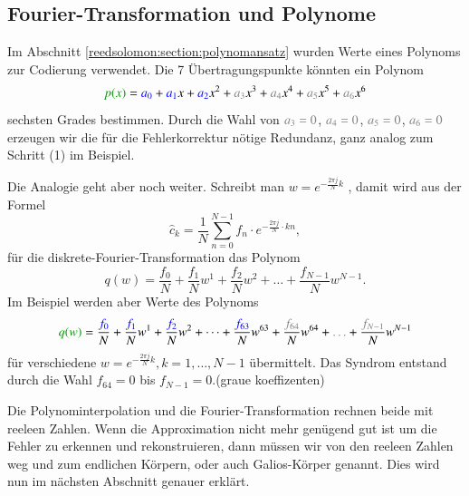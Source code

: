 \subsection{Fourier-Transformation und Polynome\label{reedsolomon:subsection:ftandpolynom}}
Im Abschnitt \ref{reedsolomon:section:polynomansatz}
wurden Werte eines Polynoms zur Codierung verwendet.
Die 7 Übertragungspunkte könnten ein Polynom
\begin{equation}
	\textcolor{darkgreen}{p(x)}
	=
	\textcolor{blue}{a_0} + \textcolor{blue}{a_1}x + \textcolor{blue}{a_2}x^2 +
	\textcolor{gray}{a_3}x^3 + \textcolor{gray}{a_4}x^4 + \textcolor{gray}{a_5}x^5 +
	\textcolor{gray}{a_6}x^6
\label{reedsolomon:equationpoly}
\end{equation}
sechsten Grades bestimmen.
Durch die Wahl von $\textcolor{gray}{a_3=0}$, $\textcolor{gray}{a_4=0}$, $\textcolor{gray}{a_5=0}$, $\textcolor{gray}{a_6=0}$ 
erzeugen wir die für die Fehlerkorrektur nötige Redundanz, ganz analog zum Schritt (1) im Beispiel.
\par 
Die Analogie geht aber noch weiter.
 Schreibt man 
 \( w =
 e^{-\frac{2\pi j}{N} k}\)
 \label{reedsolomon:DFT_summand}, damit wird aus der Formel
 \begin{equation}
	\hat{c}_{k} 
	= \frac{1}{N} \sum_{n=0}^{N-1}
	{f}_n \cdot e^{-\frac{2\pi j}{N} \cdot kn}
	,\label{reedsolomon:DFT}
 \end{equation}
 für die diskrete-Fourier-Transformation das Polynom
 \begin{equation}
	q(w)=
	\frac{{f}_0}{N} + \frac{{f}_1}{N} w^1 + \frac{{f}_2}{N} w^2 + \dots + \frac{{f}_{N-1}}{N} w^{N-1}.
	\label{reedsolomon:DFT_polynom}
 \end{equation}
 Im Beispiel werden aber Werte des Polynoms
 \begin{equation}
	\textcolor{darkgreen}{q(w)}=
	\frac{\textcolor{blue}{{f}_0}}{N} + \frac{\textcolor{blue}{{f}_1}}{N} w^1 + \frac{\textcolor{blue}{{f}_2}}{N} w^2 + \dots + 
	\frac{\textcolor{blue}{{f}_{63}}}{N} w^{63} + \frac{\textcolor{gray}{{f}_{64}}}{N} w^{64} + \textcolor{gray}{\dots} + \frac{\textcolor{gray}{{f}_{N-1}}}{N} w^{N-1}
	\label{reedsolomon:DFT_polynom2}
 \end{equation}
	für verschiedene \( w = e^{-\frac{2\pi j}{N} k}, k=1, \dots ,N-1\) übermittelt.
Das Syndrom entstand durch die Wahl ${f_{64}}=0$ bis ${f}_{N-1}=0$.(graue koeffizenten)
\par
Die Polynominterpolation und die Fourier-Transformation rechnen beide mit reeleen Zahlen.
Wenn die Approximation nicht mehr genügend gut ist um die Fehler zu erkennen und rekonstruieren,
dann müssen wir von den reeleen Zahlen weg und zum endlichen Körpern, oder auch Galios-Körper genannt.
Dies wird nun im nächsten Abschnitt genauer erklärt.

